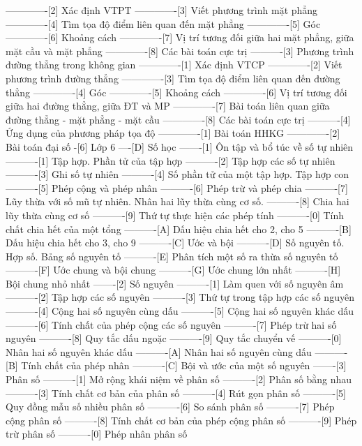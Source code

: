 -------------[2] Xác định VTPT
-------------[3] Viết phương trình mặt phẳng
-------------[4] Tìm tọa độ điểm liên quan đến mặt phẳng
-------------[5] Góc
-------------[6] Khoảng cách
-------------[7] Vị trí tương đối giữa hai mặt phẳng, giữa mặt cầu và mặt phẳng
-------------[8] Các bài toán cực trị
----------[3] Phương trình đường thẳng trong không gian
-------------[1] Xác định VTCP
-------------[2] Viết phương trình đường thẳng
-------------[3] Tìm tọa độ điểm liên quan đến đường thẳng
-------------[4] Góc
-------------[5] Khoảng cách
-------------[6] Vị trí tương đối giữa hai đường thẳng, giữa ĐT và MP
-------------[7] Bài toán liên quan giữa đường thẳng - mặt phẳng - mặt cầu
-------------[8] Các bài toán cực trị
----------[4] Ứng dụng của phương pháp tọa độ
-------------[1] Bài toán HHKG
-------------[2] Bài toán đại số
-[6] Lớp 6
----[D] Số học
-------[1] Ôn tập và bổ túc về số tự nhiên
----------[1] Tập hợp. Phần tử của tập hợp
----------[2] Tập hợp các số tự nhiên
----------[3] Ghi số tự nhiên
----------[4] Số phần tử của một tập hợp. Tập hợp con
----------[5] Phép cộng và phép nhân
----------[6] Phép trừ và phép chia
----------[7] Lũy thừa với số mũ tự nhiên. Nhân hai lũy thừa cùng cơ số.
----------[8] Chia hai lũy thừa cùng cơ số
----------[9] Thứ tự thực hiện các phép tính
----------[0] Tính chất chia hết của một tổng
----------[A] Dấu hiệu chia hết cho 2, cho 5
----------[B] Dấu hiệu chia hết cho 3, cho 9
----------[C] Ước và bội
----------[D] Số nguyên tố. Hợp số. Bảng số nguyên tố
----------[E] Phân tích một số ra thừa số nguyên tố
----------[F] Ước chung và bội chung
----------[G] Ước chung lớn nhất
----------[H] Bội chung nhỏ nhất
-------[2] Số nguyên
----------[1] Làm quen với số nguyên âm
----------[2] Tập hợp các số nguyên
----------[3] Thứ tự trong tập hợp các số nguyên
----------[4] Cộng hai số nguyên cùng dấu
----------[5] Cộng hai số nguyên khác dấu
----------[6] Tính chất của phép cộng các số nguyên
----------[7] Phép trừ hai số nguyên
----------[8] Quy tắc dấu ngoặc
----------[9] Quy tắc chuyển vế
----------[0] Nhân hai số nguyên khác dấu
----------[A] Nhân hai số nguyên cùng dấu
----------[B] Tính chất của phép nhân
----------[C] Bội và ước của một số nguyên
-------[3] Phân số
----------[1] Mở rộng khái niệm về phân số
----------[2] Phân số bằng nhau
----------[3] Tính chất cơ bản của phân số
----------[4] Rút gọn phân số
----------[5] Quy đồng mẫu số nhiều phân số
----------[6] So sánh phân số
----------[7] Phép cộng phân số
----------[8] Tính chất cơ bản của phép cộng phân số
----------[9] Phép trừ phân số
----------[0] Phép nhân phân số
